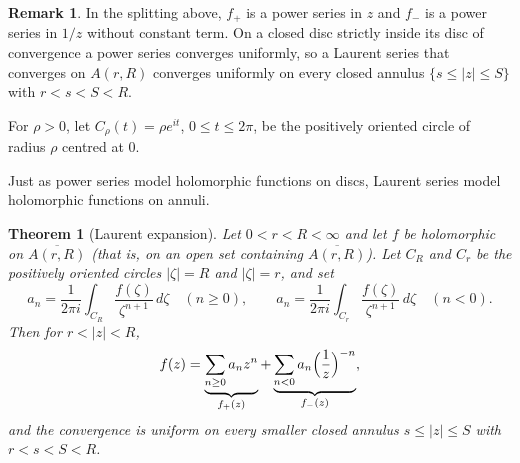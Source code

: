 \documentclass[11pt]{article}
\theoremstyle{plain}
\newtheorem{theorem}{Theorem}[section]
\theoremstyle{definition}
\theoremstyle{boldremark}
\newtheorem*{remark}{Remark}
\theoremstyle{remark}
\numberwithin{equation}{section}
\newenvironment{lecturefigure}
 {\par\addvspace{0.25em}\begingroup\setlength{\parskip}{0pt}\centering}
 {\par\endgroup\addvspace{0.25em}}
\begin{document}
\begin{remark} In the splitting above, $f_+$ is a power series in $z$ and $f_-$ is a power series in $1/z$
without constant term. On a closed disc strictly inside its disc of
convergence a power series converges uniformly, so a Laurent series that
converges on $A(r,R)$ converges uniformly on every closed annulus
$\{s\leq|z|\leq S\}$ with $r<s<S<R$. \end{remark}

For $\rho>0$, let $C_\rho(t)=\rho e^{it}$, $0\leq t\leq2\pi$, be the
positively oriented circle of radius $\rho$ centred at $0$.

\begin{lecturefigure}
\end{lecturefigure}

 Just as power series model holomorphic functions
on discs, Laurent series model holomorphic functions on annuli.

\begin{theorem}[Laurent expansion]\label{thm:laurent}
Let $0<r<R<\infty$ and let $f$ be holomorphic on $\overline{A(r,R)}$
(that is, on an open set containing $\overline{A(r,R)}$).
Let $C_R$ and $C_r$ be the positively oriented
circles $|\zeta|=R$ and $|\zeta|=r$, and set
\[
 a_n=\frac{1}{2\pi i}\int_{C_R}\frac{f(\zeta)}{\zeta^{n+1}}\,d\zeta
 \quad(n\geq0),\qquad
 a_n=\frac{1}{2\pi i}\int_{C_r}\frac{f(\zeta)}{\zeta^{n+1}}\,d\zeta
 \quad(n<0).
\]
Then for $r<|z|<R$,
\[
 f(z)=\underbrace{\sum_{n\geq0}a_nz^n}_{f_+(z)}
 +\underbrace{\sum_{n<0}a_n\Bigl(\frac1z\Bigr)^{-n}}_{f_-(z)},
\]
and the convergence is uniform on every smaller closed annulus
$s\leq|z|\leq S$ with $r<s<S<R$.
\end{theorem}
\end{document}
